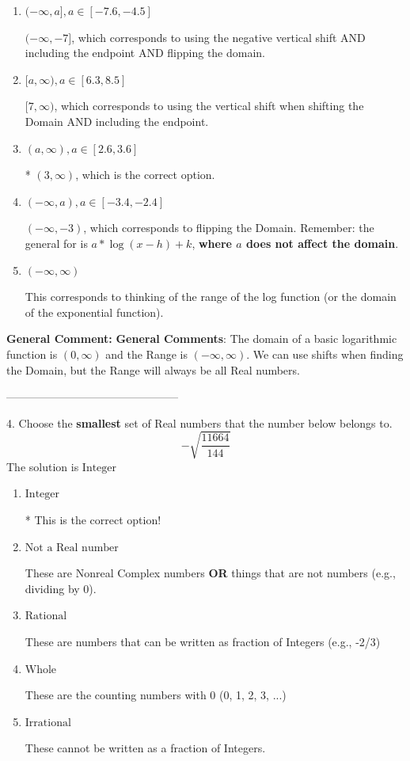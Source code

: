 \documentclass{extbook}[14pt]
\begin{document}
\begin{enumerate}[label=\Alph*.] 
\item $ (-\infty, a], a \in [-7.6, -4.5] $ 

 $(-\infty, -7]$, which corresponds to using the negative vertical shift AND including the endpoint AND flipping the domain. 
\item $ [a, \infty), a \in [6.3, 8.5] $ 

 $[7, \infty)$, which corresponds to using the vertical shift when shifting the Domain AND including the endpoint. 
\item $ (a, \infty), a \in [2.6, 3.6] $ 

 * $(3, \infty)$, which is the correct option. 
\item $ (-\infty, a), a \in [-3.4, -2.4] $ 

 $(-\infty, -3)$, which corresponds to flipping the Domain. Remember: the general for is $a*\log(x-h)+k$, \textbf{where $a$ does not affect the domain}. 
\item $ (-\infty, \infty) $ 

 This corresponds to thinking of the range of the log function (or the domain of the exponential function). 
\end{enumerate} 
 
\textbf{General Comment:} \textbf{General Comments}: The domain of a basic logarithmic function is $(0, \infty)$ and the Range is $(-\infty, \infty)$. We can use shifts when finding the Domain, but the Range will always be all Real numbers. 

-----------------------------------------------

4. Choose the \textbf{smallest} set of Real numbers that the number below belongs to.
\[ -\sqrt{\frac{11664}{144}} \] 
The solution is $ \text{Integer} $ 

\begin{enumerate}[label=\Alph*.] 
\item $ \text{Integer} $ 

 * This is the correct option! 
\item $ \text{Not a Real number} $ 

 These are Nonreal Complex numbers \textbf{OR} things that are not numbers (e.g., dividing by 0). 
\item $ \text{Rational} $ 

 These are numbers that can be written as fraction of Integers (e.g., -2/3) 
\item $ \text{Whole} $ 

 These are the counting numbers with 0 (0, 1, 2, 3, ...) 
\item $ \text{Irrational} $ 

 These cannot be written as a fraction of Integers. 
\end{enumerate} 
 
\end{document}
